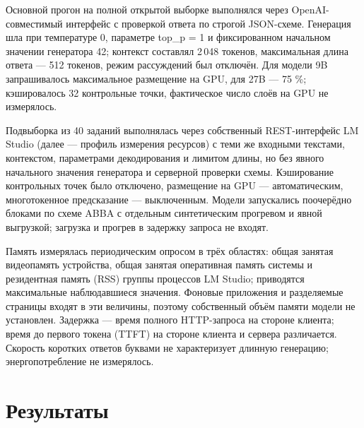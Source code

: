 \documentclass[14pt,a4paper]{extarticle}
\begin{document}
Основной прогон на полной открытой выборке выполнялся через OpenAI-совместимый интерфейс с проверкой ответа по строгой JSON-схеме. Генерация шла при температуре 0, параметре top\_p = 1 и фиксированном начальном значении генератора 42; контекст составлял 2\,048 токенов, максимальная длина ответа — 512 токенов, режим рассуждений был отключён. Для модели 9B запрашивалось максимальное размещение на GPU, для 27B — 75 \%; кэшировалось 32 контрольные точки, фактическое число слоёв на GPU не измерялось.

Подвыборка из 40 заданий выполнялась через собственный REST-интерфейс LM Studio (далее — профиль измерения ресурсов) с теми же входными текстами, контекстом, параметрами декодирования и лимитом длины, но без явного начального значения генератора и серверной проверки схемы. Кэширование контрольных точек было отключено, размещение на GPU — автоматическим, многотокенное предсказание — выключенным. Модели запускались поочерёдно блоками по схеме ABBA с отдельным синтетическим прогревом и явной выгрузкой; загрузка и прогрев в задержку запроса не входят.

Память измерялась периодическим опросом в трёх областях: общая занятая видеопамять устройства, общая занятая оперативная память системы и резидентная память (RSS) группы процессов LM Studio; приводятся максимальные наблюдавшиеся значения. Фоновые приложения и разделяемые страницы входят в эти величины, поэтому собственный объём памяти модели не установлен. Задержка — время полного HTTP-запроса на стороне клиента; время до первого токена (TTFT) на стороне клиента и сервера различается. Скорость коротких ответов буквами не характеризует длинную генерацию; энергопотребление не измерялось.

\section*{Результаты}
\end{document}
